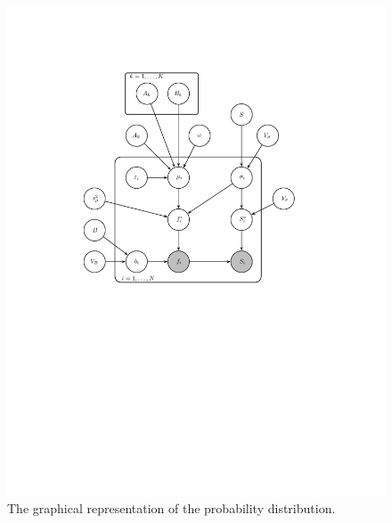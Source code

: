 \documentclass[12pt,preprint]{aastex}
\begin{document}
\clearpage
\begin{figure}
  \begin{center}
    \includegraphics[width=\textwidth,%
      trim=3cm 12cm 5cm 3cm, clip=true]{gm/gm.pdf}
  \end{center}
  \caption{The graphical representation of the probability distribution.\label{fig:graph}}
\end{figure}
\end{document}
